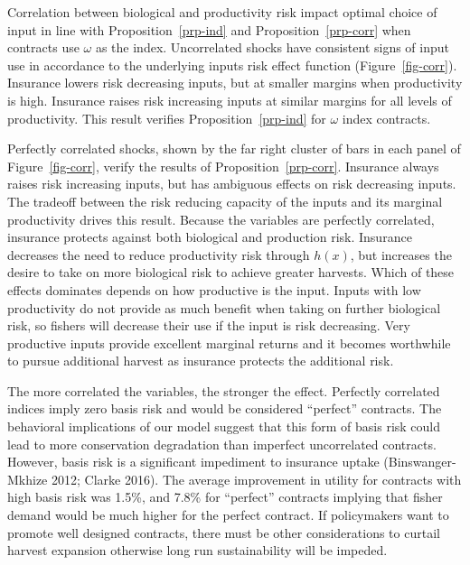 \documentclass[
  letterpaper,
  DIV=11,
  numbers=noendperiod]{scrartcl}
\theoremstyle{plain}
\theoremstyle{plain}
\theoremstyle{remark}
\begin{document}
Correlation between biological and productivity risk impact optimal
choice of input in line with Proposition~\ref{prp-ind} and
Proposition~\ref{prp-corr} when contracts use \(\omega\) as the index.
Uncorrelated shocks have consistent signs of input use in accordance to
the underlying inputs risk effect function (Figure~\ref{fig-corr}).
Insurance lowers risk decreasing inputs, but at smaller margins when
productivity is high. Insurance raises risk increasing inputs at similar
margins for all levels of productivity. This result verifies
Proposition~\ref{prp-ind} for \(\omega\) index contracts.

Perfectly correlated shocks, shown by the far right cluster of bars in
each panel of Figure~\ref{fig-corr}, verify the results of
Proposition~\ref{prp-corr}. Insurance always raises risk increasing
inputs, but has ambiguous effects on risk decreasing inputs. The
tradeoff between the risk reducing capacity of the inputs and its
marginal productivity drives this result. Because the variables are
perfectly correlated, insurance protects against both biological and
production risk. Insurance decreases the need to reduce productivity
risk through \(h(x)\), but increases the desire to take on more
biological risk to achieve greater harvests. Which of these effects
dominates depends on how productive is the input. Inputs with low
productivity do not provide as much benefit when taking on further
biological risk, so fishers will decrease their use if the input is risk
decreasing. Very productive inputs provide excellent marginal returns
and it becomes worthwhile to pursue additional harvest as insurance
protects the additional risk.

The more correlated the variables, the stronger the effect. Perfectly
correlated indices imply zero basis risk and would be considered
``perfect'' contracts. The behavioral implications of our model suggest
that this form of basis risk could lead to more conservation degradation
than imperfect uncorrelated contracts. However, basis risk is a
significant impediment to insurance uptake (Binswanger-Mkhize 2012;
Clarke 2016). The average improvement in utility for contracts with high
basis risk was 1.5\%, and 7.8\% for ``perfect'' contracts implying that
fisher demand would be much higher for the perfect contract. If
policymakers want to promote well designed contracts, there must be
other considerations to curtail harvest expansion otherwise long run
sustainability will be impeded.
\end{document}
